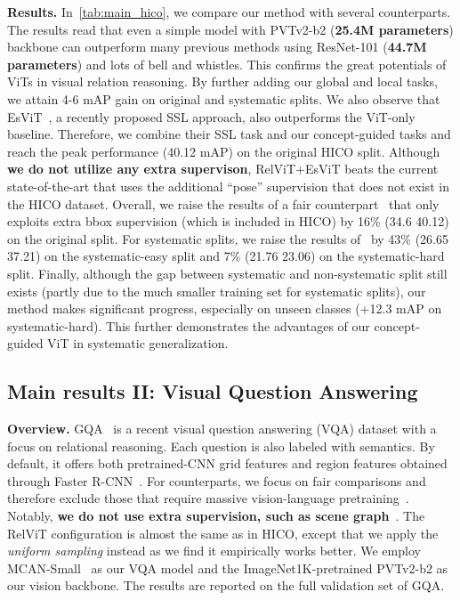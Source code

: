 \documentclass{article} \usepackage{iclr2022_conference,times}
\renewcommand{\paragraph}[1]{\noindent\textbf{#1.}}
\begin{document}
\paragraph{Results} In~\autoref{tab:main_hico}, we compare our method with several counterparts. The results read that even a simple model with PVTv2-b2 (\textbf{25.4M parameters}) backbone can outperform many previous methods using ResNet-101 (\textbf{44.7M parameters}) and lots of bell and whistles. This confirms the great potentials of ViTs in visual relation reasoning. By further adding our global and local tasks, we attain 4-6 mAP gain on original and systematic splits. We also observe that EsViT~\citep{esvit}, a recently proposed SSL approach, also outperforms the ViT-only baseline. Therefore, we combine their SSL task and our concept-guided tasks and reach the peak performance (40.12 mAP) on the original HICO split. Although \textbf{we do not utilize any extra supervison}, RelViT+EsViT beats the current state-of-the-art \cite{fang2018pairwise} that uses the additional ``pose'' supervision that does not exist in the HICO dataset.
Overall, we raise the results of a fair counterpart~\citep{girdhar2017attentional} that only exploits extra bbox supervision (which is included in HICO) by 16\% (34.6  40.12) on the original split. For systematic splits, we raise the results of~\cite{vcl} by 43\% (26.65  37.21) on the systematic-easy split and 7\% (21.76  23.06) on the systematic-hard split.
Finally, although the gap between systematic and non-systematic split still exists (partly due to the much smaller training set for systematic splits), our method makes significant progress, especially on unseen classes (+12.3 mAP on systematic-hard). This further demonstrates the advantages of our concept-guided ViT in systematic generalization.  

\vspace{-0.1in}
\subsection{Main results II: Visual Question Answering}
\vspace{-0.05in}
\label{sec:exp_vqa}

\paragraph{Overview} GQA~\citep{gqa} is a recent visual question answering (VQA) dataset with a focus on relational reasoning. Each question is also labeled with semantics. By default, it offers both pretrained-CNN grid features and region features obtained through Faster R-CNN~\citep{frcnn}. For counterparts, we focus on fair comparisons and therefore exclude those that require massive vision-language pretraining~\citep{li2019visualbert}. Notably, \textbf{we do not use extra supervision, such as scene graph}~\citep{vg}. The RelViT configuration is almost the same as in HICO, except that we apply the \emph{uniform sampling} instead as we find it empirically works better. We employ MCAN-Small~\citep{mcan} as our VQA model and the ImageNet1K-pretrained PVTv2-b2 as our vision backbone.
The results are reported on the full validation set of GQA.
\end{document}
